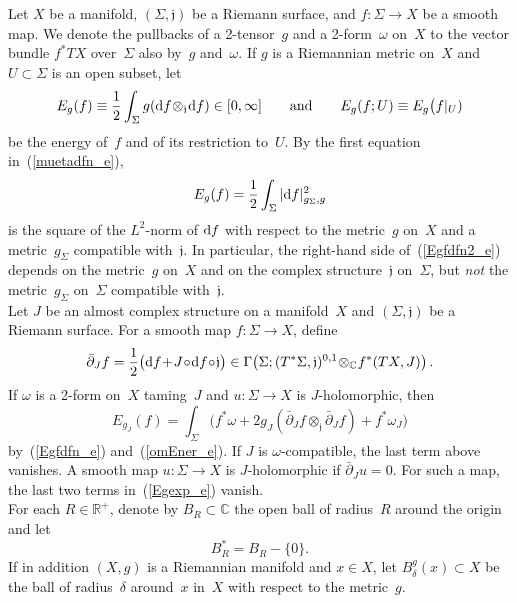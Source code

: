 \documentclass[11pt]{article}
\numberwithin{equation}{section}
\theoremstyle{definition}
\def\BE#1{\begin{equation}\label{#1}}
\def\EE{\end{equation}}
\def\eref#1{(\ref{#1})}
\def\sf#1{\textsf{#1}}
\def\lra{\longrightarrow}
\def\C{\mathbb{C}}
\def\fj{\mathfrak j}
\def\R{\mathbb R}
\def\de{\delta}
\def\om{\omega}
\def\Ga{\Gamma}
\def\Si{\Sigma}
\def\i{\infty}
\def\dbar{\bar\partial}
\def\nd{\textnormal{d}}
\begin{document}
\noindent
Let $X$ be a manifold, $(\Si,\fj)$ be a Riemann surface, 
and $f\!:\Si\!\lra\!X$ be a smooth map.
We denote the pullbacks of a 2-tensor~$g$ and a 2-form~$\om$ on~$X$
to the vector bundle $f^*TX$ over~$\Si$ also by~$g$ and~$\om$.
If $g$ is a Riemannian metric on~$X$ and $U\!\subset\!\Si$
is an open subset, let 
\BE{Egfdfn_e}E_g(f)\equiv\frac12\int_{\Si}g(\nd f\!\otimes_{\fj}\!\nd f)\in[0,\i]
\qquad\hbox{and}\qquad
E_g(f;U)\equiv E_g\big(f|_U)\EE
be the \sf{energy} of~$f$ and of its restriction to~$U$.
By the first equation in~\eref{muetadfn_e}, 
\BE{Egfdfn2_e} E_g(f)=\frac12\int_{\Si}|\nd f|_{g_{\Si},g}^2\EE
is the square of the $L^2$-norm of $\nd f$ with respect to the metric~$g$ on~$X$
and a metric~$g_{\Si}$ compatible with~$\fj$.
In particular, the right-hand side of~\eref{Egfdfn2_e} depends on the metric~$g$ on~$X$
and on the complex structure~$\fj$ on~$\Si$, but {\it not} 
the metric~$g_{\Si}$ on~$\Si$ compatible with~$\fj$.\\

\noindent
Let $J$ be an almost complex structure on a manifold~$X$ and 
$(\Si,\fj)$ be a Riemann surface.
For a smooth map $f:\Si\!\lra\!X$, define
$$\dbar_Jf=\frac{1}{2}\big(\nd f\!+\!J\!\circ\!\nd f\!\circ\!\fj\big)
\in\Ga\big(\Si;(T^*\Si,\fj)^{0,1}\!\otimes_{\C}\!f^*(TX,J)\big)\,.$$
If $\om$ is a 2-form on~$X$ taming~$J$ and \hbox{$u\!:\Si\!\lra\!X$} is $J$-holomorphic,
then
\BE{Egexp_e}
E_{g_J}(f)=\int_{\Si}\big(f^*\om\!+\!2g_J(\dbar_Jf\!\otimes_{\fj}\!\dbar_Jf)\!+\!f^*\om_J\big)\EE
by~\eref{Egfdfn_e} and~\eref{omEner_e}.
If $J$ is $\om$-compatible, the last term above vanishes.
A smooth map $u\!:\Si\!\lra\!X$ is \sf{$J$-holomorphic} if $\dbar_Ju\!=\!0$.
For such a map, the last two terms in~\eref{Egexp_e} vanish.\\

\noindent
For each $R\!\in\!\R^+$, denote by $B_R\!\subset\!\C$ the open ball of 
radius~$R$ around the origin and let 
$$B_R^*=B_R\!-\!\{0\}.$$
If in addition $(X,g)$ is a Riemannian manifold and $x\!\in\!X$,
let $B_{\de}^g(x)\!\subset\!X$ be the ball of radius~$\de$ around~$x$ in~$X$
with respect to the metric~$g$.\\
\end{document}
